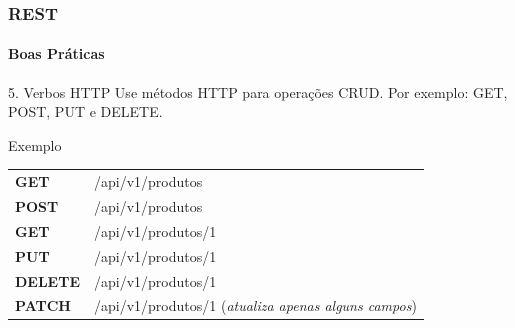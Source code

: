 \documentclass[
	9pt, %
	t, %
]{beamer}
\newcommand{\yellowbox}[1]{\colorbox{yellow!75}{#1}}
\begin{document}
\begin{frame}
	\frametitle{REST}
	\framesubtitle{Boas Práticas}

	\begin{block}{5. Verbos HTTP}
		Use métodos HTTP para operações CRUD. Por exemplo: \yellowbox{GET, POST, PUT e DELETE}.
	\end{block}

	\begin{exampleblock}{Exemplo}
		\begin{tabular}{@{}ll@{}}
			\yellowbox{\textbf{GET}}    & /api/v1/produtos                                            \\
			\yellowbox{\textbf{POST}}   & /api/v1/produtos                                            \\
			\yellowbox{\textbf{GET}}    & /api/v1/produtos/1                                          \\
			\yellowbox{\textbf{PUT}}    & /api/v1/produtos/1                                          \\
			\yellowbox{\textbf{DELETE}} & /api/v1/produtos/1                                          \\
			\yellowbox{\textbf{PATCH}}  & /api/v1/produtos/1 (\textit{atualiza apenas alguns campos})
		\end{tabular}
	\end{exampleblock}

\end{frame}
\end{document}
